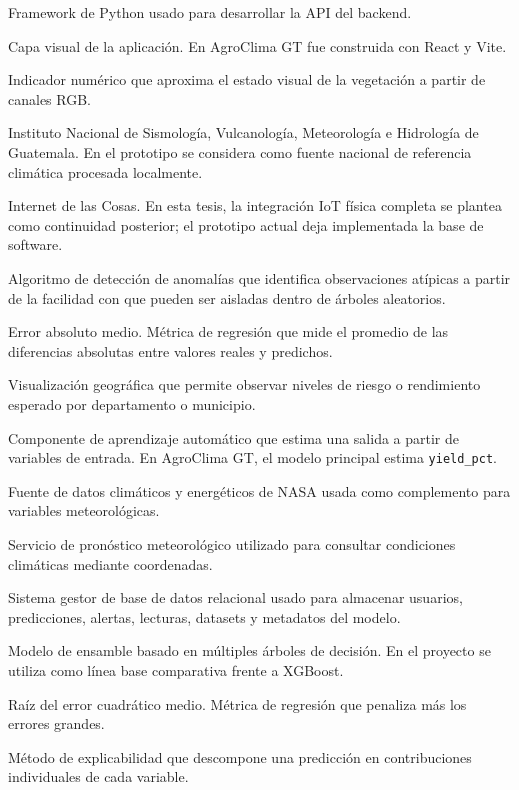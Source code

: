 \documentclass[12pt,letterpaper,oneside]{report}
\newcommand{\codigo}[1]{\texttt{#1}}
\begin{document}
\begin{description}[leftmargin=4cm,style=nextline]
\item[FastAPI.] Framework de Python usado para desarrollar la API del backend.
\item[Frontend.] Capa visual de la aplicación. En AgroClima GT fue construida con React y Vite.
\item[Índice de verdor.] Indicador numérico que aproxima el estado visual de la vegetación a partir de canales RGB.
\item[INSIVUMEH.] Instituto Nacional de Sismología, Vulcanología, Meteorología e Hidrología de Guatemala. En el prototipo se considera como fuente nacional de referencia climática procesada localmente.
\item[IoT.] Internet de las Cosas. En esta tesis, la integración IoT física completa se plantea como continuidad posterior; el prototipo actual deja implementada la base de software.
\item[Isolation Forest.] Algoritmo de detección de anomalías que identifica observaciones atípicas a partir de la facilidad con que pueden ser aisladas dentro de árboles aleatorios.
\item[MAE.] Error absoluto medio. Métrica de regresión que mide el promedio de las diferencias absolutas entre valores reales y predichos.
\item[Mapa de riesgo.] Visualización geográfica que permite observar niveles de riesgo o rendimiento esperado por departamento o municipio.
\item[Modelo predictivo.] Componente de aprendizaje automático que estima una salida a partir de variables de entrada. En AgroClima GT, el modelo principal estima \codigo{yield\_pct}.
\item[NASA POWER.] Fuente de datos climáticos y energéticos de NASA usada como complemento para variables meteorológicas.
\item[Open-Meteo.] Servicio de pronóstico meteorológico utilizado para consultar condiciones climáticas mediante coordenadas.
\item[PostgreSQL.] Sistema gestor de base de datos relacional usado para almacenar usuarios, predicciones, alertas, lecturas, datasets y metadatos del modelo.
\item[Random Forest.] Modelo de ensamble basado en múltiples árboles de decisión. En el proyecto se utiliza como línea base comparativa frente a XGBoost.
\item[RMSE.] Raíz del error cuadrático medio. Métrica de regresión que penaliza más los errores grandes.
\item[SHAP.] Método de explicabilidad que descompone una predicción en contribuciones individuales de cada variable.

\end{description}
\end{document}
